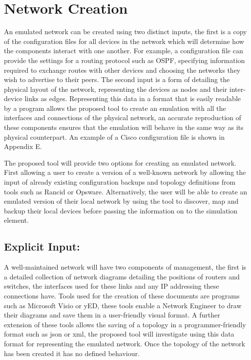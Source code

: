 \documentclass[11pt]{report}
\begin{document}
\section{Network Creation}

An emulated network can be created using two distinct inputs, the first is a copy of the configuration files for all devices in the network which will determine how the components interact with one another. For example, a configuration file can provide the settings for a routing protocol such as OSPF, specifying information required to exchange routes with other devices and choosing the networks they wish to advertise to their peers. The second input is a form of detailing the physical layout of the network, representing the devices as nodes and their inter-device links as edges. Representing this data in a format that is easily readable by a program allows the proposed tool to create an emulation with all the interfaces and connections of the physical network, an accurate reproduction of these components ensures that the emulation will behave in the same way as its physical counterpart. An example of a Cisco configuration file is shown in Appendix E.

The proposed tool will provide two options for creating an emulated network. First allowing a user to create a version of a well-known network by allowing the input of already existing configuration backups and topology definitions from tools such as Rancid or Opsware. Alternatively, the user will be able to create an emulated version of their local network by using the tool to discover, map and backup their local devices before passing the information on to the simulation element.

\subsection{Explicit Input:}

A well-maintained network will have two components of management, the first is a detailed collection of network diagrams detailing the positions of routers and switches, the interfaces used for these links and any IP addressing these connections have. Tools used for the creation of these documents are programs such as Microsoft Visio or yED, these tools enable a Network Engineer to draw their diagrams and save them in a user-friendly visual format. A further extension of these tools allows the saving of a topology in a programmer-friendly format such as json or xml, the proposed tool will investigate using this data format for representing the emulated network. Once the topology of the network has been created it has no defined behaviour.
\end{document}
